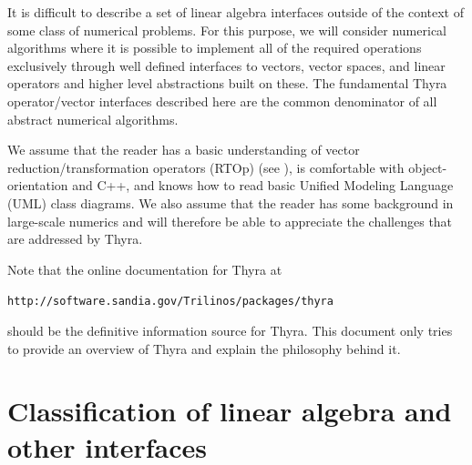 \documentclass[pdf,ps2pdf,11pt]{SANDreport}
\begin{document}
It is difficult to describe a set of linear algebra interfaces outside of the
context of some class of numerical problems.  For this purpose, we will
consider numerical algorithms where it is possible to implement all of the
required operations exclusively through well defined interfaces to vectors,
vector spaces, and linear operators and higher level abstractions built on
these.  The fundamental Thyra operator/vector interfaces described here are
the common denominator of all abstract numerical algorithms.

We assume that the reader has a basic understanding of vector
reduction/transformation operators (RTOp) (see
{}\cite{ref:rtop_toms}), is comfortable with object-orientation
{}\cite{ref:gama_et_al_1995} and C++, and knows how to read basic
Unified Modeling Language (UML) {}\cite{ref:uml_distilled_2nd_ed}
class diagrams.  We also assume that the reader has some background in
large-scale numerics and will therefore be able to appreciate the
challenges that are addressed by Thyra.


Note that the online documentation for Thyra at

\hspace{4ex}{}\texttt{http://software.sandia.gov/Trilinos/packages/thyra}

{}\noindent{}should be the definitive information source for Thyra.  This
document only tries to provide an overview of Thyra and explain the philosophy
behind it.

%
\section{Classification of linear algebra and other interfaces}
\label{thyra:sec:classification_of_lin_alg_itfc}
%
\end{document}
